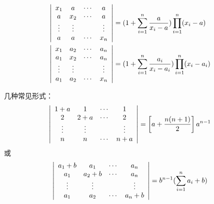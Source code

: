 \begin{li}
  $$
  \begin{aligned}
    \left|
      \begin{array}{cccc}
        x_1 &  a  & \cdots & a   \\
        a   & x_2 & \cdots & a   \\
        \vdots & \vdots &     & \vdots \\
        a   &  a  & \cdots & x_n
      \end{array}
    \right| &=   (1+\sum_{i=1}^n \frac{a}{x_i-a})\prod_{i=1}^n(x_i-a)
    \\
    \left|
      \begin{array}{cccc}
        x_1 & a_2  & \cdots & a_n   \\
        a_1 & x_2 & \cdots  & a_n   \\
        \vdots & \vdots &     & \vdots \\
        a_1 & a_2  & \cdots & x_n
      \end{array}
    \right| &=  (1+\sum_{i=1}^n \frac{a_i}{x_i-a_i})\prod_{i=1}^n(x_i-a_i)
  \end{aligned}
  $$          
\end{li}
\begin{zhu}
  几种常见形式：
  $$
  \left|
    \begin{array}{cccc}
      1+a &  1  & \cdots & 1   \\
      2   & 2+a & \cdots & 2  \\
      \vdots & \vdots &     & \vdots \\
      n   &  n  & \cdots & n+a
    \end{array}
  \right|  = \left[a+ \frac{n(n+1)}2\right]a^{n-1}
  $$
  或
  $$
  \left|
    \begin{array}{cccc}
      a_1+b & a_1   & \cdots & a_n   \\
      a_1   & a_2+b & \cdots  & a_n   \\
      \vdots   & \vdots  &     & \vdots \\
      a_1   & a_2   & \cdots & a_n+b
    \end{array}
  \right|  = b^{n-1}(\sum_{i=1}^na_i+b)
  $$      

\end{zhu}

